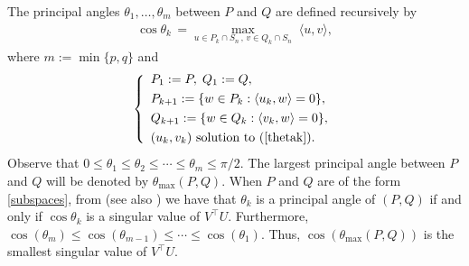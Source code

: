 \documentclass[hidelinks,onefignum,onetabnum]{siamart250211}
\theoremstyle{definition}
\theoremstyle{remark}
\begin{document}
 The principal angles  $\theta_1,\ldots,\theta_m$ between $P$ and $Q$ are defined recursively by
 \begin{eqnarray}\label{thetak}
 \cos \theta_k\, =  \max_{ u\in P_k \cap S_n\,,\,  v\in Q_k\cap  S_n}\; \langle u,v\rangle,
 \end{eqnarray}
 where $m:= \min\{ p,q\}$ and
 \begin{equation*}
\left\{\begin{array}{lll}
 P_1:=P, \;Q_1:=Q, \\ [1,2mm]
P_{k+1}:= \{w\in P_k: \langle u_k,w\rangle =0\},\\ [1,2mm]
Q_{k+1}:= \{w\in Q_k: \langle v_k,w\rangle =0\},\\ [1,2mm]
 (u_k,v_k) \mbox{ solution to } (\ref{thetak}).
\end{array}
\right.
\end{equation*}
Observe that $0\leq\theta_1\leq\theta_2\leq\cdots\leq\theta_m\leq\pi/2$. The largest principal angle between $P$ and $Q$ will be denoted by $\theta_{\max}(P,Q)$. When $P$ and $Q$ are of the form \eqref{subspaces}, from \cite[Theorem\,1]{Bjorck} (see also \cite[Theorem\,6.2]{SeSo1}) we have that $\theta_k$ is a principal angle of $(P,Q)$ if and only if $\cos\theta_k$ is a singular value of $V^\top U$. Furthermore, $\cos(\theta_m)\leq\cos(\theta_{m-1})\leq\cdots\leq\cos(\theta_1)$. Thus, $\cos(\theta_{\max}(P,Q))$ is the smallest singular value of $V^\top U$.
\end{document}
